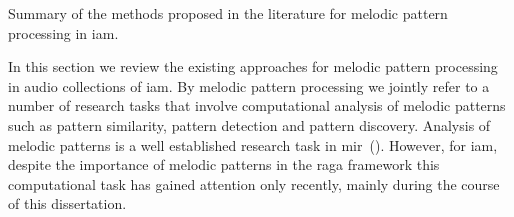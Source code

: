 \begin{table}
\begin{threeparttable}
\begin{tablenotes}
		\end{tablenotes}
		\caption[Summary of the melodic pattern processing methods for \gls{iam}]{Summary of the methods proposed in the literature for melodic pattern processing in \gls{iam}. }
		\label{tab:pattern_processing_iam}
	\end{threeparttable}
\end{table}


In this section we review the existing approaches for melodic pattern processing in audio collections of \gls{iam}. By melodic pattern processing we jointly refer to a number of research tasks that involve computational analysis of melodic patterns such as pattern similarity, pattern detection and pattern discovery. Analysis of melodic patterns is a well established research task in \gls{mir}~(). However, for \gls{iam}, despite the importance of melodic patterns in the \gls{raga} framework this computational task has gained attention only recently, mainly during the course of this dissertation. 

